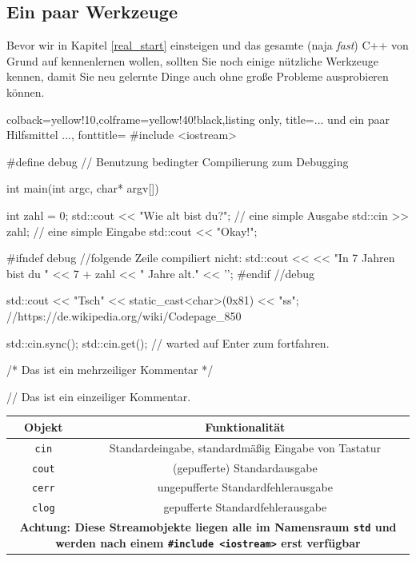 \documentclass[a4paper]{report}
\begin{document}
\subsection{Ein paar Werkzeuge}
Bevor wir in Kapitel \ref{real_start} einsteigen und das gesamte (naja \textit{fast}) C++ von Grund auf kennenlernen wollen, sollten Sie noch einige nützliche Werkzeuge kennen, damit Sie neu gelernte Dinge auch ohne große Probleme ausprobieren können.
\begin{tcblisting}{colback=yellow!10,colframe=yellow!40!black,listing only,
		title=... und ein paar Hilfsmittel ..., fonttitle=\bfseries}
#include <iostream>


#define debug // Benutzung bedingter Compilierung zum Debugging

int main(int argc, char* argv[]){
	
	int zahl = 0;
	std::cout << "Wie alt bist du?\n"; // eine simple Ausgabe
	std::cin >> zahl; // eine simple Eingabe
	std::cout << "Okay!\n\n";
	
#ifndef debug 
	//folgende Zeile compiliert nicht:
	std::cout << << "In 7 Jahren bist du " << 7 + zahl << " Jahre alt." << '\n';
#endif //debug
	
	std::cout << "Tsch" << static_cast<char>(0x81) << "ss\n";
	//https://de.wikipedia.org/wiki/Codepage_850
	
	std::cin.sync();
	std::cin.get(); // warted auf Enter zum fortfahren.
	
	/*
	Das ist
	ein mehrzeiliger
	Kommentar
	*/
	
	// Das ist ein einzeiliger Kommentar.
}
\end{tcblisting}
\begin{center}
\begin{tabular}{|c|c|}
	\hline
	\textbf{Objekt} & \textbf{Funktionalität} \\
	\hline \hline
	\texttt{cin}	& Standardeingabe, standardmäßig Eingabe von Tastatur \\
	\hline
	\texttt{cout}	& (gepufferte) Standardausgabe \\
	\texttt{cerr}	& ungepufferte Standardfehlerausgabe \\
	\texttt{clog}	& gepufferte Standardfehlerausgabe \\
	\hline
	\multicolumn{2}{|p{11cm}|}{\textbf{Achtung: Diese Streamobjekte liegen alle im Namensraum \texttt{std} und werden nach einem \texttt{\#include <iostream>} erst verfügbar}}\\
	\hline
\end{tabular}
\end{center}
\end{document}
